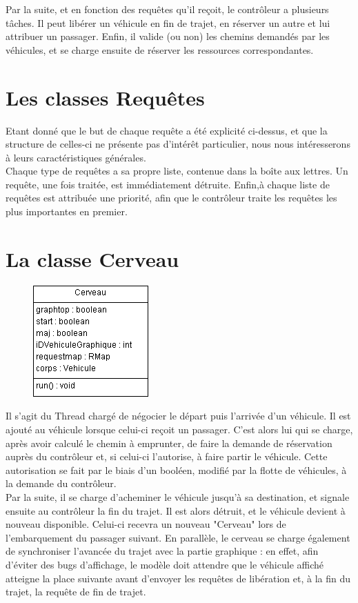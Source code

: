 \documentclass[a4paper, titlepage]{report}
\begin{document}
Par la suite, et en fonction des requêtes qu'il reçoit, le contrôleur a plusieurs tâches. Il peut libérer un véhicule en fin de trajet, en réserver un autre et lui attribuer un passager. Enfin, il valide (ou non) les chemins demandés par les véhicules, et se charge ensuite de réserver les ressources correspondantes.
\section{Les classes Requêtes}

Etant donné que le but de chaque requête a été explicité ci-dessus, et que la structure de celles-ci ne présente pas d'intérêt particulier, nous nous intéresserons à leurs caractéristiques générales. \\
Chaque type de requêtes a sa propre liste, contenue dans la boîte aux lettres. Un requête, une fois traitée, est immédiatement détruite. Enfin,à chaque liste de requêtes est attribuée une priorité, afin que le contrôleur traite les requêtes les plus importantes en premier.

\section{La classe Cerveau}
\begin{figure}
\vspace{-0.5cm}
\includegraphics[scale=1]{Images/cerveau.png}
\end{figure}Il s'agit du Thread chargé de négocier le départ puis l'arrivée d'un véhicule. Il est ajouté au véhicule lorsque celui-ci reçoit un passager. C'est alors lui qui se charge, après avoir calculé le chemin à emprunter, de faire la demande de réservation auprès du contrôleur et, si celui-ci l'autorise, à faire partir le véhicule. Cette autorisation se fait par le biais d'un booléen, modifié par la flotte de véhicules, à la demande du contrôleur.\\
Par la suite, il se charge d'acheminer le véhicule jusqu'à sa destination, et signale ensuite au contrôleur la fin du trajet. Il est alors détruit, et le véhicule devient à nouveau disponible. Celui-ci recevra un nouveau "Cerveau" lors de l'embarquement du passager suivant.
\vspace{0.3cm}
En parallèle, le cerveau se charge également de synchroniser l'avancée du trajet avec la partie graphique : en effet, afin d'éviter des bugs d'affichage, le modèle doit attendre que le véhicule affiché atteigne la place suivante avant d'envoyer les requêtes de libération et, à la fin du trajet, la requête de fin de trajet.
\vspace{0.5cm}
\end{document}
